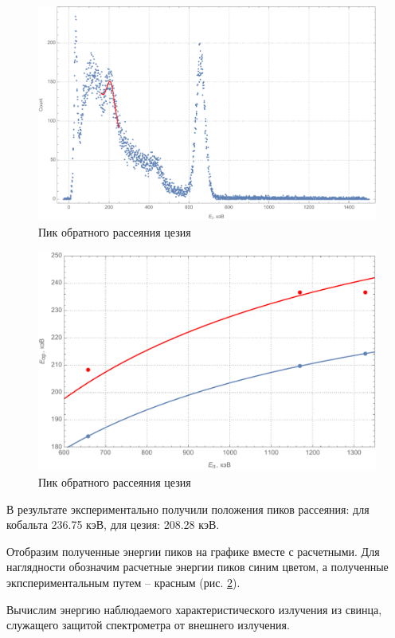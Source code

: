 \documentclass[a4paper, 12pt]{article}
\begin{document}
\begin{figure}[!htb]
\centering
\includegraphics[scale=0.46]{cs137Reverse.pdf}
\caption{Пик обратного рассеяния цезия}
\label{fig:ce137Re}
\end{figure}
\begin{figure}[!htb]
\centering
\includegraphics[scale=0.6]{gotPeaks.pdf}
\caption{Пик обратного рассеяния цезия}
\label{fig:gotPeaks}
\end{figure}
\par
В результате экспериментально получили положения пиков рассеяния: для кобальта 236.75 кэВ, для цезия: 208.28 кэВ.\par
Отобразим полученные энергии пиков на графике вместе с расчетными. Для наглядности обозначим расчетные энергии пиков синим цветом, а полученные экпспериментальным путем -- красным (рис. \ref{fig:gotPeaks}).\par
Вычислим энергию наблюдаемого характеристического излучения из свинца, служащего защитой спектрометра от внешнего излучения.\par
\end{document}
